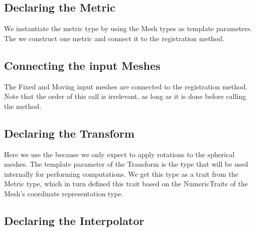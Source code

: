 \documentclass{InsightArticle}
\begin{document}
\begin{center}

\end{center}


\subsection{Declaring the Metric}

We instantiate the metric type by using the Mesh types as template parameters.
The we construct one metric and connect it to the registration method.

\begin{center}

\end{center}

\subsection{Connecting the input Meshes}

The Fixed and Moving input meshes are connected to the registration method.
Note that the order of this call is irrelevant, as long as it is done before
calling the  method.

\begin{center}

\end{center}

\subsection{Declaring the Transform}

Here we use the  because we only expect to apply
rotations to the spherical meshes. The template parameter of the Transform is
the type that will be used internally for performing computations. We get this
type as a trait from the Metric type, which in turn defined this trait based on
the NumericTraits of the Mesh's coordinate representation type.

\begin{center}

\end{center}


\subsection{Declaring the Interpolator}
\end{document}
